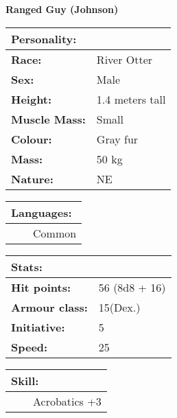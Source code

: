 \documentclass[11pt]{article}
\newcommand{\tabitem}{~~\llap{--}~~}
\begin{document}
	\begin{center}
\Huge \textbf{Ranged Guy (Johnson)}
	\end{center}
	\begin{multicols}{2}
\noindent \begin{tabularx}{\linewidth}{@{}l l}
\Large \textbf{Personality:} 	& 							\\
\hline
\textbf{Race:} 					& River Otter	 			\\
\textbf{Sex:} 					& Male 						\\
\textbf{Height:} 				& 1.4 meters tall		 	\\
\textbf{Muscle Mass:} 			& Small 					\\
\textbf{Colour:} 				& Gray fur				 	\\
\textbf{Mass:} 					& 50 kg		 				\\
\textbf{Nature:} 				& NE
		\end{tabularx}

\vspace{4mm}

\noindent \begin{tabularx}{\linewidth}{@{}l}
{\Large \textbf{Languages:}} \\
\hline
\tabitem Common \\
		\end{tabularx}

\vspace{4mm}

\noindent \begin{tabularx}{\linewidth}{@{}l l}
\Large \textbf{Stats:}		 	& 									\\
\hline
\textbf{Hit points:} 			& 56 (8d8 + 16) 					\\
\textbf{Armour class:} 			& 15(Dex.)					 		\\
\textbf{Initiative:} 			& 5									\\
\textbf{Speed:} 				& 25		 						\\
		\end{tabularx}

\vspace{2mm}

\noindent \begin{tabularx}{\linewidth}{@{}l}
{\Large \textbf{Skill:}} \\
\hline
\tabitem Acrobatics +3
		\end{tabularx}

\vspace{4mm}


\end{multicols}
\end{document}
